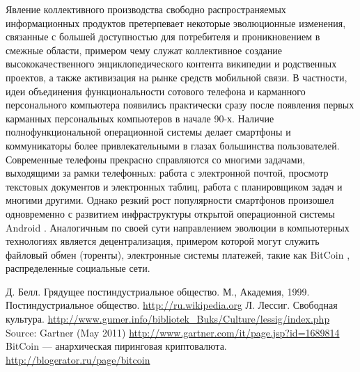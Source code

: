 \documentclass[10pt, a5paper]{article}
\begin{document}
Явление коллективного производства свободно распространяемых информационных продуктов претерпевает некоторые эволюционные изменения, связанные с большей доступностью для потребителя и проникновением в смежные области, примером чему служат коллективное создание высококачественного энциклопедического контента википедии и родственных проектов, а также активизация на рынке средств мобильной связи. В частности, идеи объединения функциональности сотового телефона и карманного персонального компьютера появились практически сразу после появления первых карманных персональных компьютеров в начале 90-х. Наличие полнофункциональной операционной системы делает смартфоны и коммуникаторы более привлекательными в глазах большинства пользователей. Современные телефоны прекрасно справляются со многими задачами, выходящими за рамки телефонных: работа с электронной почтой, просмотр текстовых документов и электронных таблиц, работа с планировщиком задач и многими другими. Однако резкий рост популярности смартфонов произошел одновременно с развитием инфраструктуры открытой операционной системы Android \cite{ivanova4}.
Аналогичным по своей сути направлением эволюции в компьютерных технологиях является децентрализация, примером которой могут служить файловый обмен (торенты), электронные системы платежей, такие как BitCoin \cite{ivanova5}, распределенные социальные сети.

\newpage\begin{thebibliography}{9}
	 Д. Белл. Грядущее постиндустриальное общество. М., Академия, 1999.
	 Постиндустриальное общество. \url{http://ru.wikipedia.org}  
	 Л. Лессиг. Свободная культура. \url{http://www.gumer.info/bibliotek_Buks/Culture/lessig/index.php}
	 Source: Gartner (May 2011) \url{http://www.gartner.com/it/page.jsp?id=1689814}
	 BitCoin --- анархическая пиринговая криптовалюта. \url{http://blogerator.ru/page/bitcoin}
\end{thebibliography}
\end{document}
